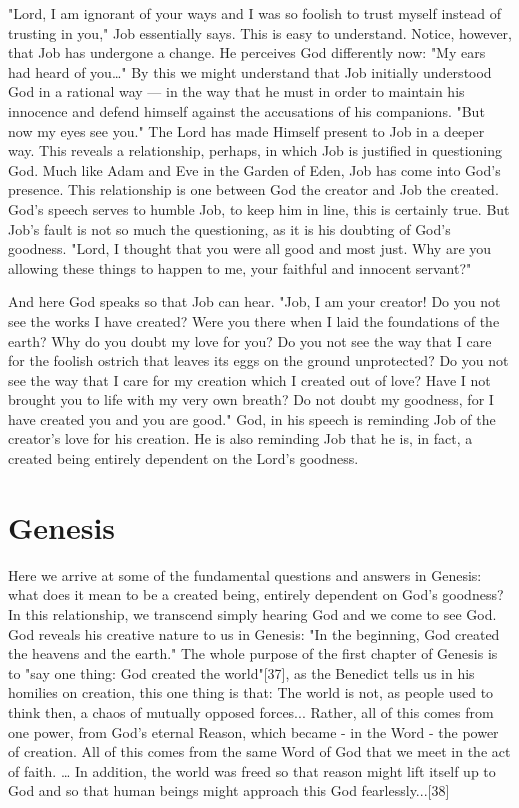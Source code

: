 "Lord, I am ignorant of your ways and I was so foolish to trust myself instead of trusting in you," Job essentially says. This is easy to understand. Notice, however, that Job has undergone a change. He perceives God differently now: "My ears had heard of you…" By this we might understand that Job initially understood God in a rational way — in the way that he must in order to maintain his innocence and defend himself against the accusations of his companions. "But now my eyes see you." The Lord has made Himself present to Job in a deeper way. This reveals a relationship, perhaps, in which Job is justified in questioning God. Much like Adam and Eve in the Garden of Eden, Job has come into God's presence. This relationship is one between God the creator and Job the created. God's speech serves to humble Job, to keep him in line, this is certainly true. But Job's fault is not so much the questioning, as it is his doubting of God's goodness. "Lord, I thought that you were all good and most just. Why are you allowing these things to happen to me, your faithful and innocent servant?"

And here God speaks so that Job can hear. "Job, I am your creator! Do you not see the works I have created? Were you there when I laid the foundations of the earth? Why do you doubt my love for you? Do you not see the way that I care for the foolish ostrich that leaves its eggs on the ground unprotected? Do you not see the way that I care for my creation which I created out of love? Have I not brought you to life with my very own breath? Do not doubt my goodness, for I have created you and you are good." God, in his speech is reminding Job of the creator's love for his creation. He is also reminding Job that he is, in fact, a created being entirely dependent on the Lord's goodness.

	\section{Genesis}
Here we arrive at some of the fundamental questions and answers in Genesis: what does it mean to be a created being, entirely dependent on God's goodness? In this relationship, we transcend simply hearing God and we come to see God. God reveals his creative nature to us in Genesis: "In the beginning, God created the heavens and the earth." The whole purpose of the first chapter of Genesis is to "say one thing: God created the world"[37], as the Benedict tells us in his homilies on creation, this one thing is that: 
The world is not, as people used to think then, a chaos of mutually opposed forces... Rather, all of this comes from one power, from God's eternal Reason, which became - in the Word - the power of creation. All of this comes from the same Word of God that we meet in the act of faith. … In addition, the world was freed so that reason might lift itself up to God and so that human beings might approach this God fearlessly...[38]


